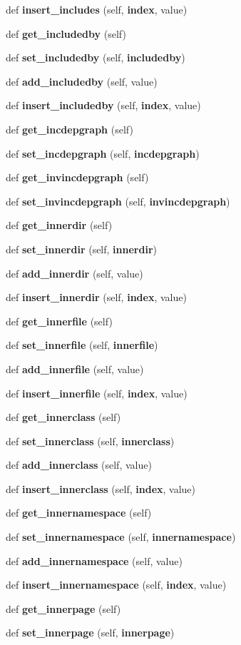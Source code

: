 \begin{DoxyCompactItemize}
def {\bf insert\+\_\+includes} (self, {\bf index}, value)
\item 
def {\bf get\+\_\+includedby} (self)
\item 
def {\bf set\+\_\+includedby} (self, {\bf includedby})
\item 
def {\bf add\+\_\+includedby} (self, value)
\item 
def {\bf insert\+\_\+includedby} (self, {\bf index}, value)
\item 
def {\bf get\+\_\+incdepgraph} (self)
\item 
def {\bf set\+\_\+incdepgraph} (self, {\bf incdepgraph})
\item 
def {\bf get\+\_\+invincdepgraph} (self)
\item 
def {\bf set\+\_\+invincdepgraph} (self, {\bf invincdepgraph})
\item 
def {\bf get\+\_\+innerdir} (self)
\item 
def {\bf set\+\_\+innerdir} (self, {\bf innerdir})
\item 
def {\bf add\+\_\+innerdir} (self, value)
\item 
def {\bf insert\+\_\+innerdir} (self, {\bf index}, value)
\item 
def {\bf get\+\_\+innerfile} (self)
\item 
def {\bf set\+\_\+innerfile} (self, {\bf innerfile})
\item 
def {\bf add\+\_\+innerfile} (self, value)
\item 
def {\bf insert\+\_\+innerfile} (self, {\bf index}, value)
\item 
def {\bf get\+\_\+innerclass} (self)
\item 
def {\bf set\+\_\+innerclass} (self, {\bf innerclass})
\item 
def {\bf add\+\_\+innerclass} (self, value)
\item 
def {\bf insert\+\_\+innerclass} (self, {\bf index}, value)
\item 
def {\bf get\+\_\+innernamespace} (self)
\item 
def {\bf set\+\_\+innernamespace} (self, {\bf innernamespace})
\item 
def {\bf add\+\_\+innernamespace} (self, value)
\item 
def {\bf insert\+\_\+innernamespace} (self, {\bf index}, value)
\item 
def {\bf get\+\_\+innerpage} (self)
\item 
def {\bf set\+\_\+innerpage} (self, {\bf innerpage})
\item 

\end{DoxyCompactItemize}
